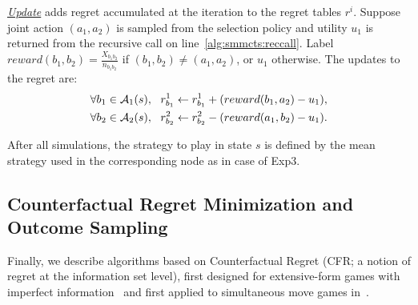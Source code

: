 \emph{\underline{Update}} adds regret accumulated at the iteration to
the regret tables $r^i$. Suppose joint action $(a_1,a_2)$ is
sampled from the selection policy and utility $u_1$ is returned from the recursive call on line~\ref{alg:smmcts:reccall}.
Label $reward(b_1,b_2) = \frac{X_{b_1b_2}}{n_{b_1b_2}}$ if
$(b_1,b_2) \not= (a_1,a_2)$, or $u_1$ otherwise. The updates to the regret are:
\begin{eqnarray}
\forall b_1 \in \mathcal{A}_1(s), ~~  r^1_{b_1} \leftarrow r^1_{b_1} + ( reward(b_1, a_2) - u_1 ),\\
\forall b_2 \in \mathcal{A}_2(s), ~~  r^2_{b_2} \leftarrow r^2_{b_2} - ( reward(a_1, b_2) - u_1).
\end{eqnarray}

After all simulations, the strategy to play in state $s$ is defined by the mean strategy used in the corresponding node as in case of Exp3.

\subsection{Counterfactual Regret Minimization and Outcome Sampling} \label{sec:algs:cfros}

Finally, we describe algorithms based on Counterfactual Regret (CFR; a notion of regret at the information set level),
first designed for extensive-form games with imperfect information~\cite{CFR} and first applied to simultaneous move games in~\cite{Lanctot13Goofspiel}.

